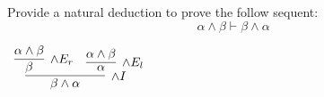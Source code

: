 \documentclass{book}
\begin{document}
    \begin{eg}

        Provide a natural deduction to prove the follow sequent: $$ \alpha \land \beta \vdash \beta \land \alpha $$

        \begin{center}
            $\begin{array}{c}
                \infer[\land I]{\beta \land \alpha}
                    {\infer[\land E_{r}]{\beta}
                        {\alpha \land \beta}
                    &
                    \infer[\land E_{l}]{\alpha}
                        {\alpha \land \beta}}
            \end{array}$
        \end{center}
        
    \end{eg}
\end{document}
